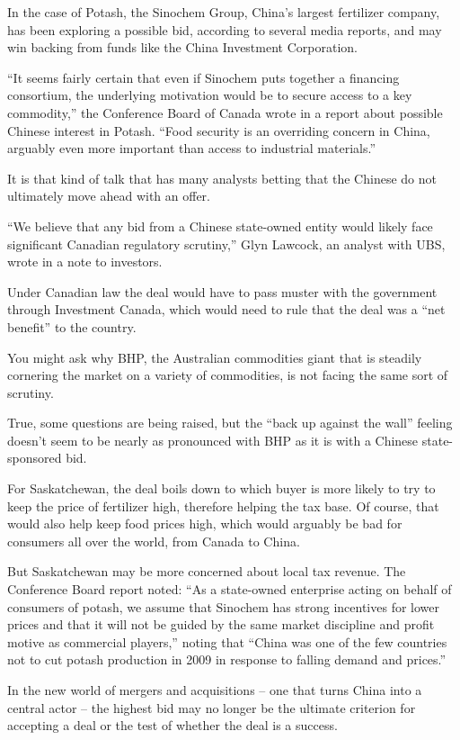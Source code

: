 ﻿\documentclass[12pt]{article}
\begin{document}
In the case of Potash, the Sinochem Group, China's largest fertilizer company, has been exploring a
possible bid, according to several media reports, and may win backing from funds like the China
Investment Corporation.

``It seems fairly certain that even if Sinochem puts together a financing consortium, the underlying
motivation would be to secure access to a key commodity,'' the Conference Board of Canada wrote in a
report about possible Chinese interest in Potash. ``Food security is an overriding concern in China,
arguably even more important than access to industrial materials.''

It is that kind of talk that has many analysts betting that the Chinese do not ultimately move ahead
with an offer.

``We believe that any bid from a Chinese state-owned entity would likely face significant Canadian
regulatory scrutiny,'' Glyn Lawcock, an analyst with UBS, wrote in a note to investors.

Under Canadian law the deal would have to pass muster with the government through Investment Canada,
which would need to rule that the deal was a ``net benefit'' to the country.

You might ask why BHP, the Australian commodities giant that is steadily cornering the market on a
variety of commodities, is not facing the same sort of scrutiny.

True, some questions are being raised, but the ``back up against the wall'' feeling doesn't seem to
be nearly as pronounced with BHP as it is with a Chinese state-sponsored bid.

For Saskatchewan, the deal boils down to which buyer is more likely to try to keep the price of
fertilizer high, therefore helping the tax base. Of course, that would also help keep food prices
high, which would arguably be bad for consumers all over the world, from Canada to China.

But Saskatchewan may be more concerned about local tax revenue. The Conference Board report noted:
``As a state-owned enterprise acting on behalf of consumers of potash, we assume that Sinochem has
strong incentives for lower prices and that it will not be guided by the same market discipline and
profit motive as commercial players,'' noting that ``China was one of the few countries not to cut
potash production in 2009 in response to falling demand and prices.''

In the new world of mergers and acquisitions -- one that turns China into a central actor -- the
highest bid may no longer be the ultimate criterion for accepting a deal or the test of whether the
deal is a success.
\end{document}
